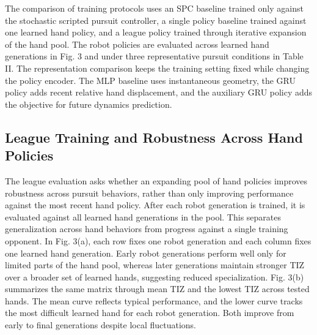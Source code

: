 \documentclass[journal,twoside,web]{ieeecolor2}
\begin{document}
The comparison of training protocols uses an SPC baseline trained only against the stochastic scripted pursuit controller, a single policy baseline trained against one learned hand policy, and a league policy trained through iterative expansion of the hand pool. The robot policies are evaluated across learned hand generations in Fig. 3 and under three representative pursuit conditions in Table II. The representation comparison keeps the training setting fixed while changing the policy encoder. The MLP baseline uses instantaneous geometry, the GRU policy adds recent relative hand displacement, and the auxiliary GRU policy adds the objective for future dynamics prediction.

\subsection{League Training and Robustness Across Hand Policies}
The league evaluation asks whether an expanding pool of hand policies improves robustness across pursuit behaviors, rather than only improving performance against the most recent hand policy. After each robot generation is trained, it is evaluated against all learned hand generations in the pool. This separates generalization across hand behaviors from progress against a single training opponent. In Fig. 3(a), each row fixes one robot generation and each column fixes one learned hand generation. Early robot generations perform well only for limited parts of the hand pool, whereas later generations maintain stronger TIZ over a broader set of learned hands, suggesting reduced specialization. Fig. 3(b) summarizes the same matrix through mean TIZ and the lowest TIZ across tested hands. The mean curve reflects typical performance, and the lower curve tracks the most difficult learned hand for each robot generation. Both improve from early to final generations despite local fluctuations.
\end{document}
